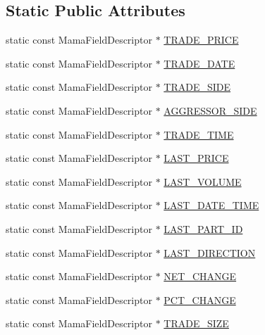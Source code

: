\subsection*{Static Public Attributes}
\begin{CompactItemize}
\item 
static const Mama\-Field\-Descriptor $\ast$ \hyperlink{classWombat_1_1MamdaTradeFields_c31684b8cd859faa39f3667d800251a4}{TRADE\_\-PRICE}
\item 
static const Mama\-Field\-Descriptor $\ast$ \hyperlink{classWombat_1_1MamdaTradeFields_d352e18b6a100f63ba69b7cd1b8fdbcf}{TRADE\_\-DATE}
\item 
static const Mama\-Field\-Descriptor $\ast$ \hyperlink{classWombat_1_1MamdaTradeFields_489a22aa13c199f52adc525f42e4c17a}{TRADE\_\-SIDE}
\item 
static const Mama\-Field\-Descriptor $\ast$ \hyperlink{classWombat_1_1MamdaTradeFields_8d76fbcd235f0a017c250d1bb0d046b3}{AGGRESSOR\_\-SIDE}
\item 
static const Mama\-Field\-Descriptor $\ast$ \hyperlink{classWombat_1_1MamdaTradeFields_a2a29223ba29fc76a509cfc5b8a07f86}{TRADE\_\-TIME}
\item 
static const Mama\-Field\-Descriptor $\ast$ \hyperlink{classWombat_1_1MamdaTradeFields_2e4b6108572cf8630c0da4a7dd92352f}{LAST\_\-PRICE}
\item 
static const Mama\-Field\-Descriptor $\ast$ \hyperlink{classWombat_1_1MamdaTradeFields_6454093ec627b9e602d55a526fc96706}{LAST\_\-VOLUME}
\item 
static const Mama\-Field\-Descriptor $\ast$ \hyperlink{classWombat_1_1MamdaTradeFields_63ad97c46807040d061e09add6d0e066}{LAST\_\-DATE\_\-TIME}
\item 
static const Mama\-Field\-Descriptor $\ast$ \hyperlink{classWombat_1_1MamdaTradeFields_0772bce076015f719acbdf2269fbd96b}{LAST\_\-PART\_\-ID}
\item 
static const Mama\-Field\-Descriptor $\ast$ \hyperlink{classWombat_1_1MamdaTradeFields_c491446ae286c84cebedad263ade2773}{LAST\_\-DIRECTION}
\item 
static const Mama\-Field\-Descriptor $\ast$ \hyperlink{classWombat_1_1MamdaTradeFields_d82f6483b9ce4c51802b26e12081123e}{NET\_\-CHANGE}
\item 
static const Mama\-Field\-Descriptor $\ast$ \hyperlink{classWombat_1_1MamdaTradeFields_6660740a6794b766f6449f4b56e89333}{PCT\_\-CHANGE}
\item 
static const Mama\-Field\-Descriptor $\ast$ \hyperlink{classWombat_1_1MamdaTradeFields_d330bd57df4a8c1d80114ba006b84a49}{TRADE\_\-SIZE}

\end{CompactItemize}
